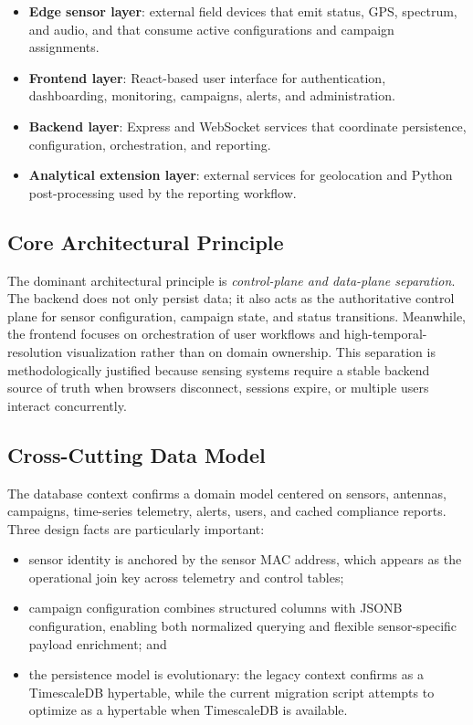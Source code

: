 \documentclass[11pt,a4paper]{article}
\newcommand{\code}[1]{\path{#1}}
\begin{document}
\begin{itemize}
  \item \textbf{Edge sensor layer}: external field devices that emit status, GPS, spectrum, and audio, and that consume active configurations and campaign assignments.
  \item \textbf{Frontend layer}: React-based user interface for authentication, dashboarding, monitoring, campaigns, alerts, and administration.
  \item \textbf{Backend layer}: Express and WebSocket services that coordinate persistence, configuration, orchestration, and reporting.
  \item \textbf{Analytical extension layer}: external services for geolocation and Python post-processing used by the reporting workflow.
\end{itemize}

\subsection{Core Architectural Principle}
The dominant architectural principle is \textit{control-plane and data-plane separation}. The backend does not only persist data; it also acts as the authoritative control plane for sensor configuration, campaign state, and status transitions. Meanwhile, the frontend focuses on orchestration of user workflows and high-temporal-resolution visualization rather than on domain ownership. This separation is methodologically justified because sensing systems require a stable backend source of truth when browsers disconnect, sessions expire, or multiple users interact concurrently.

\subsection{Cross-Cutting Data Model}
The database context confirms a domain model centered on sensors, antennas, campaigns, time-series telemetry, alerts, users, and cached compliance reports. Three design facts are particularly important:

\begin{itemize}
  \item sensor identity is anchored by the sensor MAC address, which appears as the operational join key across telemetry and control tables;
  \item campaign configuration combines structured columns with JSONB configuration, enabling both normalized querying and flexible sensor-specific payload enrichment; and
  \item the persistence model is evolutionary: the legacy context confirms \code{sensor_status} as a TimescaleDB hypertable, while the current migration script attempts to optimize \code{sensor_data} as a hypertable when TimescaleDB is available.
\end{itemize}
\end{document}
